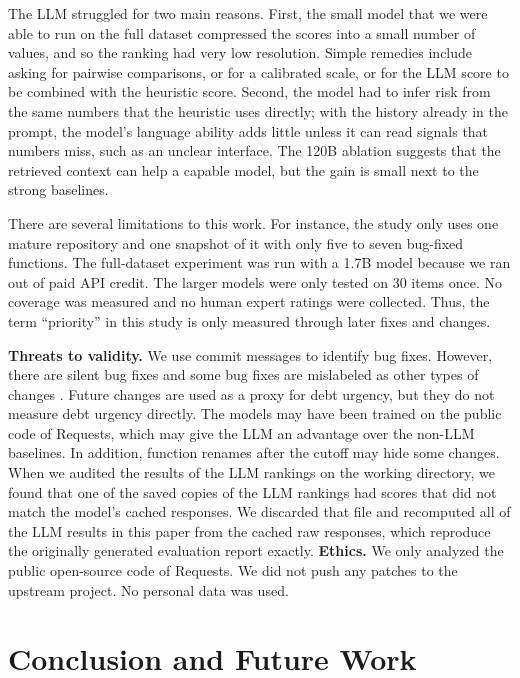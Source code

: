\documentclass[12pt,onecolumn,draftclsnofoot]{IEEEtran}
\begin{document}
The LLM struggled for two main reasons. First, the small model that we were able to run on the full dataset compressed the scores into a small number of values, and so the ranking had very low resolution. Simple remedies include asking for pairwise comparisons, or for a calibrated scale, or for the LLM score to be combined with the heuristic score. Second, the model had to infer risk from the same numbers that the heuristic uses directly; with the history already in the prompt, the model's language ability adds little unless it can read signals that numbers miss, such as an unclear interface. The 120B ablation suggests that the retrieved context can help a capable model, but the gain is small next to the strong baselines.

There are several limitations to this work. For instance, the study only uses one mature repository and one snapshot of it with only five to seven bug-fixed functions. The full-dataset experiment was run with a 1.7B model because we ran out of paid API credit. The larger models were only tested on 30 items once. No coverage was measured and no human expert ratings were collected. Thus, the term ``priority'' in this study is only measured through later fixes and changes.

\textbf{Threats to validity.} We use commit messages to identify bug fixes. However, there are silent bug fixes and some bug fixes are mislabeled as other types of changes \cite{sliwerski2005}. Future changes are used as a proxy for debt urgency, but they do not measure debt urgency directly. The models may have been trained on the public code of Requests, which may give the LLM an advantage over the non-LLM baselines. In addition, function renames after the cutoff may hide some changes. When we audited the results of the LLM rankings on the working directory, we found that one of the saved copies of the LLM rankings had scores that did not match the model's cached responses. We discarded that file and recomputed all of the LLM results in this paper from the cached raw responses, which reproduce the originally generated evaluation report exactly. \textbf{Ethics.} We only analyzed the public open-source code of Requests. We did not push any patches to the upstream project. No personal data was used.

\section{Conclusion and Future Work}
\label{sec:conclusion}
\end{document}
